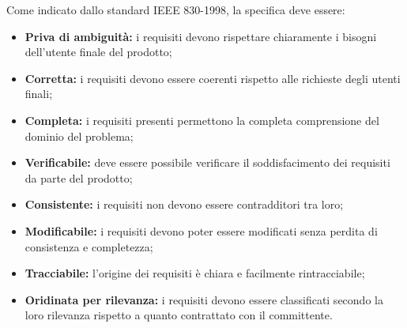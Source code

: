 Come indicato dallo standard IEEE 830-1998, la specifica deve essere:
\begin{itemize}
	\item \textbf{Priva di ambiguità:} i requisiti devono rispettare chiaramente i bisogni dell'utente finale del prodotto;
	\item \textbf{Corretta:} i requisiti devono essere coerenti rispetto alle richieste degli utenti finali;
	\item \textbf{Completa:} i requisiti presenti permettono la completa comprensione del dominio del problema;
	\item \textbf{Verificabile:} deve essere possibile verificare il soddisfacimento dei requisiti da parte del prodotto;
	\item \textbf{Consistente:} i requisiti non devono essere contradditori tra loro;
	\item \textbf{Modificabile:} i requisiti devono poter essere modificati senza perdita di consistenza e completezza;
	\item \textbf{Tracciabile:} l'origine dei requisiti è chiara e facilmente rintracciabile;
	\item \textbf{Oridinata per rilevanza:} i requisiti devono essere classificati secondo la loro rilevanza rispetto a quanto contrattato con il committente.
\end{itemize}